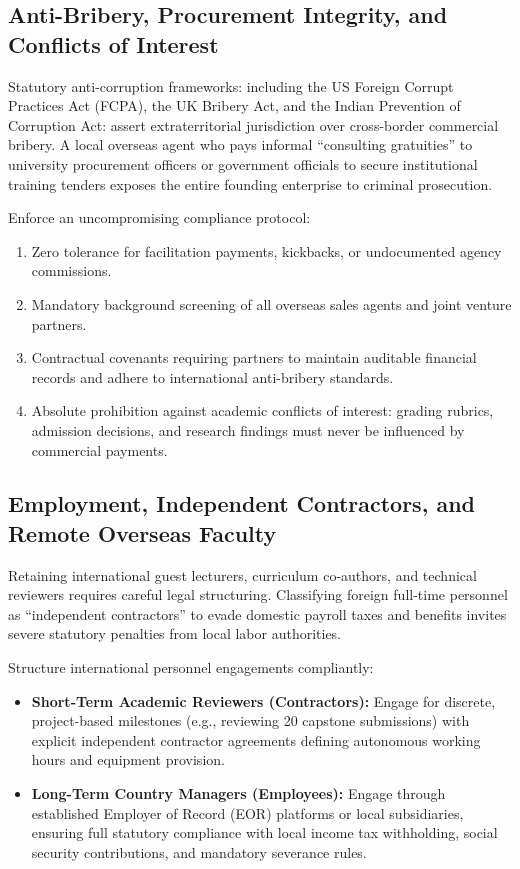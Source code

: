 \subsection{Anti-Bribery, Procurement Integrity, and Conflicts of Interest}
\label{sec:anti_bribery_procurement_integrity}

Statutory anti-corruption frameworks: including the US Foreign Corrupt Practices Act (FCPA), the UK Bribery Act, and the Indian Prevention of Corruption Act: assert extraterritorial jurisdiction over cross-border commercial bribery. A local overseas agent who pays informal ``consulting gratuities'' to university procurement officers or government officials to secure institutional training tenders exposes the entire founding enterprise to criminal prosecution.

Enforce an uncompromising compliance protocol:
\begin{enumerate}
\item Zero tolerance for facilitation payments, kickbacks, or undocumented agency commissions.
\item Mandatory background screening of all overseas sales agents and joint venture partners.
\item Contractual covenants requiring partners to maintain auditable financial records and adhere to international anti-bribery standards.
\item Absolute prohibition against academic conflicts of interest: grading rubrics, admission decisions, and research findings must never be influenced by commercial payments.
\end{enumerate}

\subsection{Employment, Independent Contractors, and Remote Overseas Faculty}
\label{sec:overseas_faculty_contractor_classification}

Retaining international guest lecturers, curriculum co-authors, and technical reviewers requires careful legal structuring. Classifying foreign full-time personnel as ``independent contractors'' to evade domestic payroll taxes and benefits invites severe statutory penalties from local labor authorities.

Structure international personnel engagements compliantly:
\begin{itemize}
\item \textbf{Short-Term Academic Reviewers (Contractors):} Engage for discrete, project-based milestones (e.g., reviewing 20 capstone submissions) with explicit independent contractor agreements defining autonomous working hours and equipment provision.
\item \textbf{Long-Term Country Managers (Employees):} Engage through established Employer of Record (EOR) platforms or local subsidiaries, ensuring full statutory compliance with local income tax withholding, social security contributions, and mandatory severance rules.
\end{itemize}

